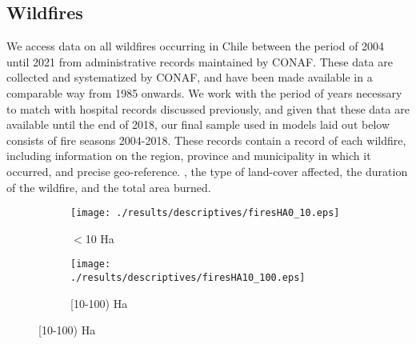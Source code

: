 \documentclass[11pt]{article}
\begin{document}
\begin{spacing}{1.5}
\subsection{Wildfires}
\label{sscn:fires} 
We access data on all wildfires occurring in Chile between the period of 2004 until 2021 from administrative records maintained by CONAF.  These data are collected and systematized by CONAF, and have been made available in a comparable way from 1985 onwards. We work with the period of years necessary to match with hospital records discussed previously, and given that these data are available until the end of 2018, our final sample used in models laid out below consists of fire seasons 2004-2018.  These records contain a record of each wildfire, including information on the region, province and municipality in which it occurred, and precise geo-reference. 
, the type of land-cover affected, the duration of the wildfire, and the total area burned.  


\begin{figure}[ht!]
    \centering
    \caption{Wildfire Exposures by Magnitude of Fire}
    \label{fig:descfires}
    \begin{subfigure}{0.49\textwidth}
          \texttt{[image: ./results/descriptives/firesHA0\_10.eps]}
         \caption{$<$10 Ha}
    \end{subfigure}
    \begin{subfigure}{0.49\textwidth}
          \texttt{[image: ./results/descriptives/firesHA10\_100.eps]}
         \caption{[10-100) Ha}
    \end{subfigure}


\end{figure}
\end{spacing}
\end{document}

